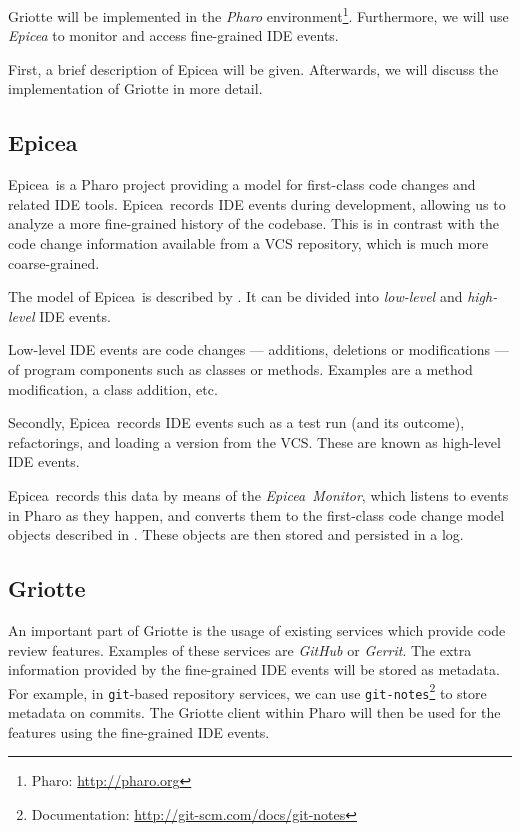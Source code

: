 \documentclass[conference,a4paper]{IEEEtran}
\newcommand{\Ep}{Epicea}
\newcommand{\code}[1]{\texttt{#1}}
\begin{document}
Griotte will be implemented in the \textit{Pharo}
environment\cite{Blac09a}\footnote{Pharo: \url{http://pharo.org}}.
Furthermore, we will use \textit{Epicea}\cite{Dias13a} to monitor and
access fine-grained IDE events.

First, a brief description of Epicea will be given. Afterwards, we
will discuss the implementation of Griotte in more detail.

\subsection{Epicea}
\label{sec:epicea}

\Ep\ is a Pharo project providing a model for first-class code changes
and related IDE tools. \Ep\ records IDE events during development,
allowing us to analyze a more fine-grained history of the
codebase. This is in contrast with the code change information
available from a VCS repository, which is much more coarse-grained.

The model of \Ep\ is described by . It
can be divided into \textit{low-level} and \textit{high-level} IDE
events.

Low-level IDE events are code changes --- additions, deletions or
modifications --- of program components such as classes or
methods. Examples are a method modification, a class addition, etc.

Secondly, \Ep\ records IDE events such as a test run (and its
outcome), refactorings, and loading a version from the VCS. These are
known as high-level IDE events.

\Ep\ records this data by means of the \textit{\Ep\ Monitor}, which
listens to events in Pharo as they happen, and converts them to the
first-class code change model objects described in
. These objects are then stored and
persisted in a log.

\subsection{Griotte}
\label{sec:griotte}

An important part of Griotte is the usage of existing services which
provide code review features. Examples of these services are
\textit{GitHub} or \textit{Gerrit}. The extra information provided by
the fine-grained IDE events will be stored as metadata. For example,
in \code{git}-based repository services, we can use
\code{git-notes}\footnote{Documentation:
  \url{http://git-scm.com/docs/git-notes}} to store metadata on
commits. The Griotte client within Pharo will then be used for the
features using the fine-grained IDE events.
\end{document}
